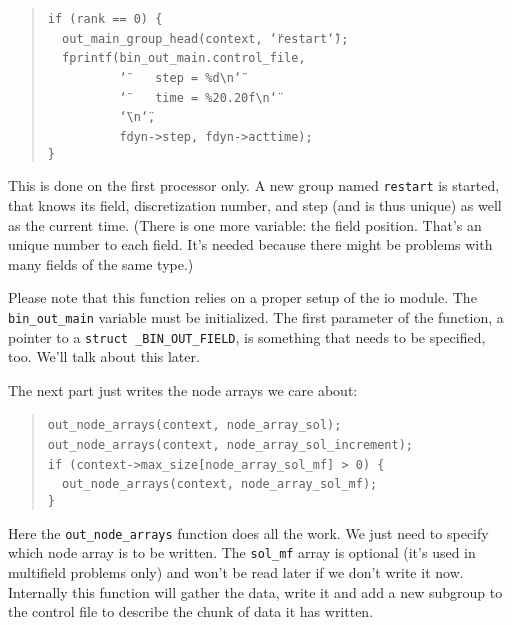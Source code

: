 \begin{quote}
\texttt{if~(rank~==~0)~{\{}~}~\\
 \texttt{~~out{\_}main{\_}group{\_}head(context,~\char`\"{}restart\char`\"{});~}~\\
 \texttt{~~fprintf(bin{\_}out{\_}main.control{\_}file,~}~\\
 \texttt{~~~~~~~~~~\char`\"{}~~~~step~=~{\%}d{\textbackslash{}}n\char`\"{}~}~\\
 \texttt{~~~~~~~~~~\char`\"{}~~~~time~=~{\%}20.20f{\textbackslash{}}n\char`\"{}~}~\\
 \texttt{~~~~~~~~~~\char`\"{}{\textbackslash{}}n\char`\"{},~}~\\
 \texttt{~~~~~~~~~~fdyn->step,~fdyn->acttime);~}~\\
 \texttt{{\}} }
\end{quote}
This is done on the first processor only. A new group named \texttt{restart}
is started, that knows its field, discretization number, and step
(and is thus unique) as well as the current time. (There is one more
variable: the field position. That's an unique number to each field.
It's needed because there might be problems with many fields of the
same type.)

Please note that this function relies on a proper setup of the io
module. The \texttt{bin{\_}out{\_}main} variable must be initialized.
The first parameter of the function, a pointer to a \texttt{struct
{\_}BIN{\_}OUT{\_}FIELD}, is something that needs to be specified,
too. We'll talk about this later.

The next part just writes the node arrays we care about: 

\begin{quote}
\texttt{out{\_}node{\_}arrays(context,~node{\_}array{\_}sol);~}~\\
 \texttt{out{\_}node{\_}arrays(context,~node{\_}array{\_}sol{\_}increment);~}~\\
 \texttt{if~(context->max{\_}size{[}node{\_}array{\_}sol{\_}mf]~>~0)~{\{}~}~\\
 \texttt{~~out{\_}node{\_}arrays(context,~node{\_}array{\_}sol{\_}mf);~}~\\
 \texttt{{\}} }
\end{quote}
Here the \texttt{out{\_}node{\_}arrays} function does all the
work. We just need to specify which node array is to be written. The
\texttt{sol{\_}mf} array is optional (it's used in multifield problems
only) and won't be read later if we don't write it now. Internally
this function will gather the data, write it and add a new subgroup
to the control file to describe the chunk of data it has written.

